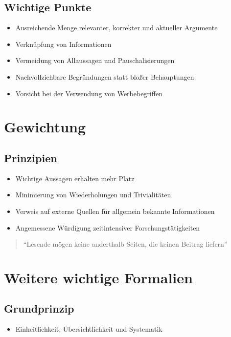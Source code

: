 \documentclass[a4paper,12pt]{article}
\begin{document}
\subsection{Wichtige Punkte}
\begin{itemize}
    \item Ausreichende Menge relevanter, korrekter und aktueller Argumente
    \item Verknüpfung von Informationen
    \item Vermeidung von Allaussagen und Pauschalisierungen
    \item Nachvollziehbare Begründungen statt bloßer Behauptungen
    \item Vorsicht bei der Verwendung von Werbebegriffen
\end{itemize}

\section{Gewichtung}

\subsection{Prinzipien}
\begin{itemize}
    \item Wichtige Aussagen erhalten mehr Platz
    \item Minimierung von Wiederholungen und Trivialitäten
    \item Verweis auf externe Quellen für allgemein bekannte Informationen
    \item Angemessene Würdigung zeitintensiver Forschungstätigkeiten
\end{itemize}

\begin{quote}
``Lesende mögen keine anderthalb Seiten, die keinen Beitrag liefern''
\end{quote}


\section{Weitere wichtige Formalien}

\subsection{Grundprinzip}
\begin{itemize}
    \item Einheitlichkeit, Übersichtlichkeit und Systematik
\end{itemize}
\end{document}
